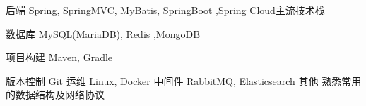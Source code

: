 

\begin{cvskills}

  \cvskill
    {后端} %
    {Spring, SpringMVC, MyBatis, SpringBoot ,Spring Cloud主流技术栈} %

  \cvskill
    {数据库} %
	{MySQL(MariaDB), Redis ,MongoDB} %

  \cvskill
    {项目构建} %
    {Maven, Gradle} %

  \cvskill
    {版本控制} %
    {Git} %
   \cvskill
    {运维} %
    {Linux, Docker } %
    \cvskill
    {中间件} %
    {RabbitMQ, Elasticsearch } %
    \cvskill
    {其他} %
    {熟悉常用的数据结构及网络协议 } %
	

\end{cvskills}

